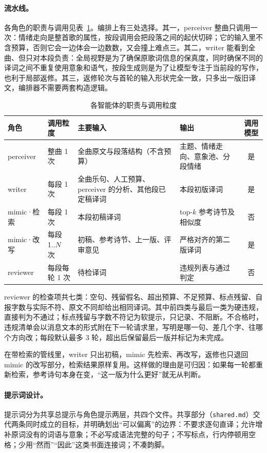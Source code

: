 \documentclass[12pt, a4paper]{ctexart}
\numberwithin{table}{section}
\numberwithin{figure}{section}
\begin{document}
\paragraph{流水线。}
各角色的职责与调用见表~\ref{tab:agents}。编排上有三处选择。其一，perceiver 整曲只调用一次：情绪走向是整首歌的属性，按段调用会把段落之间的起伏切碎；它的输入里不含预算，否则它会一边体会一边数数，又会撞上难点三。其二，writer 能看到全曲、但只对本段负责：全局视野是为了确保原歌词信息的保真度，同时确保不同的译词之间不重复使用意象和语气，按段生成则是为了让模型专注于当前段的写作，也利于局部返修。其三，返修轮次与首轮的输入形状完全一致，只多出一版旧译文，编排器不需要两套构造逻辑。

\begin{table}[htbp]
  \centering
  \small
  \caption{各智能体的职责与调用粒度}
  \label{tab:agents}
  \begin{tabular}{p{}p{}p{}p{}c}
    \toprule
    角色 & 调用粒度 & 主要输入 & 输出 & 调用模型 \\
    \midrule
    perceiver & 整曲 1 次 & 全曲原文与段落结构（不含预算） & 主题、情绪走向、意象池、分段情绪 & 是 \\
    writer & 每段 1 次 & 全曲乐句、人工预算、perceiver 的分析、其他段已定稿译词 & 本段初版译词 & 是 \\
    mimic·检索 & 每段 1 次 & 本段初稿译词 & top-$k$ 参考诗节及相似度 & 否 \\
    mimic·改写 & 每段 1..$N$ 次 & 初稿、参考诗节、上一版、评审意见 & 严格对齐的第二版译词 & 是 \\
    reviewer & 每段每轮 1 次 & 待检译词 & 违规列表与通过判定 & 否 \\
    \bottomrule
  \end{tabular}
\end{table}

reviewer 的检查项共七类：空句、残留假名、超出预算、不足预算、标点残留、自报字数与实际不符、原文不同却给出相同译词。其中前四类与最后一类为硬违规，直接判为不通过；标点残留与字数不符记为软提示，只记录、不阻断。不合格时，违规清单会以消息文本的形式附在下一轮请求里，写明是哪一句、差几个字、往哪个方向改；每段默认最多 3 轮，超出后保留最后一版并标记为未完成。

在带检索的管线里，writer 只出初稿，mimic 先检索、再改写，返修也只退回 mimic 的改写部分，检索结果原样复用。这样做的理由是可归因：如果每一轮都重新检索，参考诗句本身在变，“这一版为什么更好”就无从判断。

\paragraph{提示词设计。}
提示词分为共享总提示与角色提示两层，共四个文件。共享部分（\texttt{shared.md}）交代两条同时成立的目标，并明确划出“可以偏离”的边界：不要求逐句直译；允许增补原词没有的词语与意象；不必写成语法完整的句子；不写标点，行内停顿用空格；少用“然而”“因此”这类书面连接词；不凑韵脚。
\end{document}
